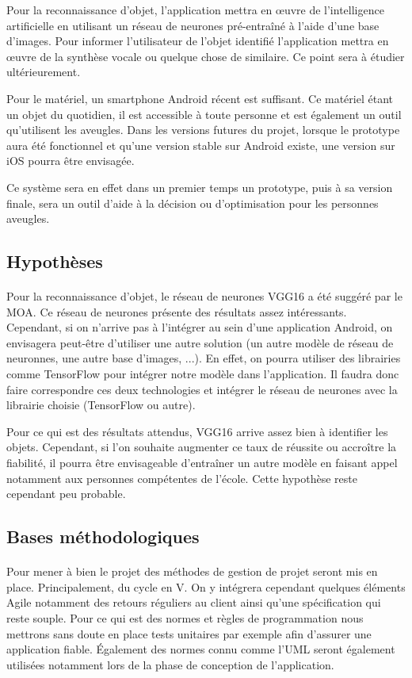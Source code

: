 \documentclass[CDS,UTF8,final]{EPURapport}
\begin{document}
Pour la reconnaissance d’objet, l’application mettra en œuvre de l’intelligence artificielle en utilisant un réseau de neurones pré-entraîné à l'aide d'une base d’images. Pour informer l’utilisateur de l’objet identifié l’application mettra en œuvre de la synthèse vocale ou quelque chose de similaire. Ce point sera à étudier ultérieurement.

Pour le matériel, un smartphone Android récent est suffisant. Ce matériel étant un objet du quotidien, il est accessible à toute personne et est également un outil qu'utilisent les aveugles. Dans les versions futures du projet, lorsque le prototype aura été fonctionnel et qu’une version stable sur Android existe, une version sur iOS pourra être envisagée.

Ce système sera en effet dans un premier temps un prototype, puis à sa version finale, sera un outil d’aide à la décision ou d’optimisation pour les personnes aveugles. 

\subsection{Hypothèses}
\paragraph{}
Pour la reconnaissance d’objet, le réseau de neurones VGG16 a été suggéré par le MOA. Ce réseau de neurones présente des résultats assez intéressants. Cependant, si on n’arrive pas à l’intégrer au sein d’une application Android, on envisagera peut-être d’utiliser une autre solution (un autre modèle de réseau de neuronnes, une autre base d'images, ...). En effet, on pourra utiliser des librairies comme TensorFlow pour intégrer notre modèle dans l'application. Il faudra donc faire correspondre ces deux technologies et intégrer le réseau de neurones avec la librairie choisie (TensorFlow ou autre).

Pour ce qui est des résultats attendus, VGG16 arrive assez bien à identifier les objets. Cependant, si l’on souhaite augmenter ce taux de réussite ou accroître la fiabilité, il pourra être envisageable d’entraîner un autre modèle en faisant appel notamment aux personnes compétentes de l’école. Cette hypothèse reste cependant peu probable.

\subsection{Bases méthodologiques}
\paragraph{}
Pour mener à bien le projet des méthodes de gestion de projet seront mis en place. Principalement, du cycle en V. On y intégrera cependant quelques éléments Agile notamment des retours réguliers au client ainsi qu'une spécification qui reste souple. Pour ce qui est des normes et règles de programmation nous mettrons sans doute en place tests unitaires par exemple afin d’assurer une application fiable. Également des normes connu comme l'UML seront également utilisées notamment lors de la phase de conception de l'application. 
\end{document}
